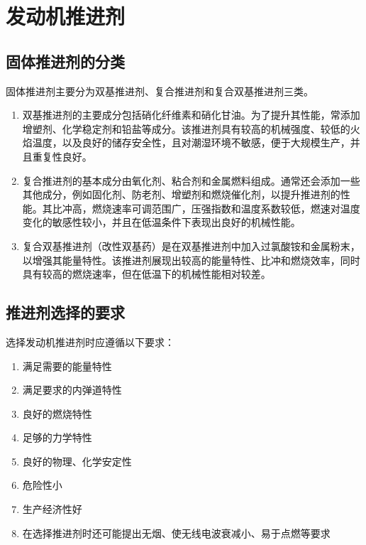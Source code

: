 \section{发动机推进剂}

\subsection{固体推进剂的分类}

固体推进剂主要分为双基推进剂、复合推进剂和复合双基推进剂三类。

\begin{enumerate}[leftmargin=2em]
    \item 双基推进剂的主要成分包括硝化纤维素和硝化甘油。为了提升其性能，常添加增塑剂、化学稳定剂和铅盐等成分。该推进剂具有较高的机械强度、较低的火焰温度，以及良好的储存安全性，且对潮湿环境不敏感，便于大规模生产，并且重复性良好。

    \item 复合推进剂的基本成分由氧化剂、粘合剂和金属燃料组成。通常还会添加一些其他成分，例如固化剂、防老剂、增塑剂和燃烧催化剂，以提升推进剂的性能。其比冲高，燃烧速率可调范围广，压强指数和温度系数较低，燃速对温度变化的敏感性较小，并且在低温条件下表现出良好的机械性能。

    \item 复合双基推进剂（改性双基药）是在双基推进剂中加入过氯酸铵和金属粉末，以增强其能量特性。该推进剂展现出较高的能量特性、比冲和燃烧效率，同时具有较高的燃烧速率，但在低温下的机械性能相对较差。
\end{enumerate}

\subsection{推进剂选择的要求}

选择发动机推进剂时应遵循以下要求：

\begin{enumerate}[leftmargin=2em]
    \item 满足需要的能量特性
    \item 满足要求的内弹道特性
    \item 良好的燃烧特性
    \item 足够的力学特性
    \item 良好的物理、化学安定性
    \item 危险性小
    \item 生产经济性好
    \item 在选择推进剂时还可能提出无烟、使无线电波衰减小、易于点燃等要求
\end{enumerate}